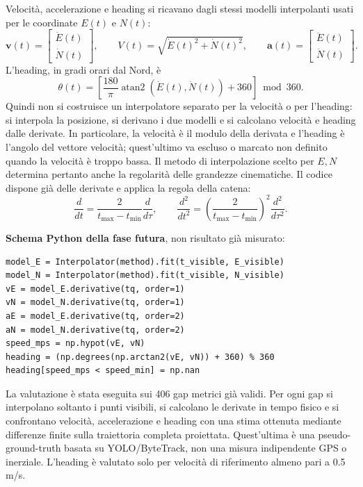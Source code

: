 \documentclass[11pt,a4paper]{article}
\numberwithin{equation}{section}
\begin{document}
Velocità, accelerazione e heading si ricavano dagli stessi modelli interpolanti
usati per le coordinate $E(t)$ e $N(t)$:
\begin{equation}
 \mathbf v(t)=\begin{bmatrix}\dot E(t)\\\dot N(t)\end{bmatrix},\qquad
 V(t)=\sqrt{\dot E(t)^2+\dot N(t)^2},\qquad
 \mathbf a(t)=\begin{bmatrix}\ddot E(t)\\\ddot N(t)\end{bmatrix}.
\end{equation}
L'heading, in gradi orari dal Nord, è
\begin{equation}
 \theta(t)=\left[\frac{180}{\pi}\operatorname{atan2}(\dot E(t),\dot N(t))+360\right]\bmod360.
\end{equation}
Quindi non si costruisce un interpolatore separato per la velocità o per
l'heading: si interpola la posizione, si derivano i due modelli e si
calcolano velocità e heading dalle derivate. In particolare, la velocità
è il modulo della derivata e l'heading è l'angolo del vettore velocità;
quest'ultimo va escluso o marcato non definito quando la velocità è
troppo bassa. Il metodo di interpolazione scelto per $E,N$ determina
pertanto anche la regolarità delle grandezze cinematiche.
Il codice dispone già delle derivate e applica la regola della catena:
\begin{equation}
 \frac{d}{dt}=\frac{2}{t_{\max}-t_{\min}}\frac{d}{d\tau},\qquad
 \frac{d^2}{dt^2}=\left(\frac{2}{t_{\max}-t_{\min}}\right)^2\frac{d^2}{d\tau^2}.
\end{equation}

\textbf{Schema Python della fase futura}, non risultato già misurato:
\begin{lstlisting}
model_E = Interpolator(method).fit(t_visible, E_visible)
model_N = Interpolator(method).fit(t_visible, N_visible)
vE = model_E.derivative(tq, order=1)
vN = model_N.derivative(tq, order=1)
aE = model_E.derivative(tq, order=2)
aN = model_N.derivative(tq, order=2)
speed_mps = np.hypot(vE, vN)
heading = (np.degrees(np.arctan2(vE, vN)) + 360) % 360
heading[speed_mps < speed_min] = np.nan
\end{lstlisting}
La valutazione è stata eseguita sui 406 gap metrici già validi. Per ogni
gap si interpolano soltanto i punti visibili, si calcolano le derivate in
tempo fisico e si confrontano velocità, accelerazione e heading con una
stima ottenuta mediante differenze finite sulla traiettoria completa
proiettata. Quest'ultima è una pseudo-ground-truth basata su
YOLO/ByteTrack, non una misura indipendente GPS o inerziale. L'heading è
valutato solo per velocità di riferimento almeno pari a \num{0.5} m/s.
\end{document}
